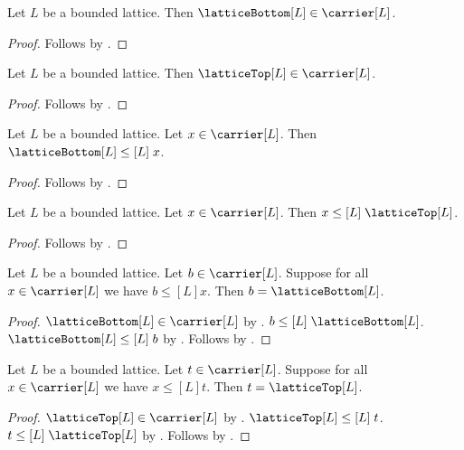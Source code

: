 \begin{proposition}\label{lattice_bottom_type}
    Let $L$ be a bounded lattice.
    Then $\latticeBottom[L]\in\carrier[L]$.
\end{proposition}
\begin{proof}
    Follows by .
\end{proof}

\begin{proposition}\label{lattice_top_type}
    Let $L$ be a bounded lattice.
    Then $\latticeTop[L]\in\carrier[L]$.
\end{proposition}
\begin{proof}
    Follows by .
\end{proof}

\begin{proposition}\label{lattice_bottom_leq}
    Let $L$ be a bounded lattice.
    Let $x\in\carrier[L]$.
    Then $\latticeBottom[L]\mathrel{\leq[L]}x$.
\end{proposition}
\begin{proof}
    Follows by .
\end{proof}

\begin{proposition}\label{lattice_leq_top}
    Let $L$ be a bounded lattice.
    Let $x\in\carrier[L]$.
    Then $x\mathrel{\leq[L]}\latticeTop[L]$.
\end{proposition}
\begin{proof}
    Follows by .
\end{proof}

\begin{proposition}\label{lattice_bottom_unique}
    Let $L$ be a bounded lattice.
    Let $b\in\carrier[L]$.
    Suppose for all $x\in\carrier[L]$ we have
        $b\mathrel{\leq[L]}x$.
    Then $b=\latticeBottom[L]$.
\end{proposition}
\begin{proof}
    $\latticeBottom[L]\in\carrier[L]$ by .
    $b\mathrel{\leq[L]}\latticeBottom[L]$.
    $\latticeBottom[L]\mathrel{\leq[L]}b$ by
        .
    Follows by
        .
\end{proof}

\begin{proposition}\label{lattice_top_unique}
    Let $L$ be a bounded lattice.
    Let $t\in\carrier[L]$.
    Suppose for all $x\in\carrier[L]$ we have
        $x\mathrel{\leq[L]}t$.
    Then $t=\latticeTop[L]$.
\end{proposition}
\begin{proof}
    $\latticeTop[L]\in\carrier[L]$ by .
    $\latticeTop[L]\mathrel{\leq[L]}t$.
    $t\mathrel{\leq[L]}\latticeTop[L]$ by
        .
    Follows by
        .
\end{proof}

